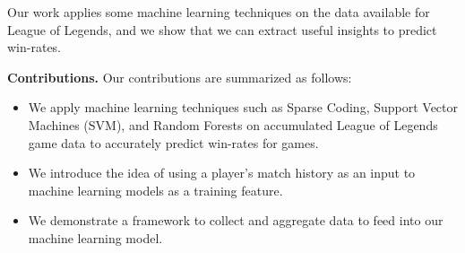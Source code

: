 Our work applies some 
machine learning techniques on the data available for League of Legends, and we show that
we can extract useful insights to predict win-rates.

\textbf{ Contributions.} Our contributions are summarized as follows:
\begin{itemize}
\item We apply machine learning techniques such as Sparse Coding, Support Vector Machines (SVM), 
and Random Forests on accumulated League of Legends 
game data to accurately predict win-rates for games. 
\item We introduce the idea of using a player's match history as an input to machine learning 
models as a training feature.
\item We demonstrate a framework to collect and aggregate data to feed into our machine learning model.
\end{itemize} 
